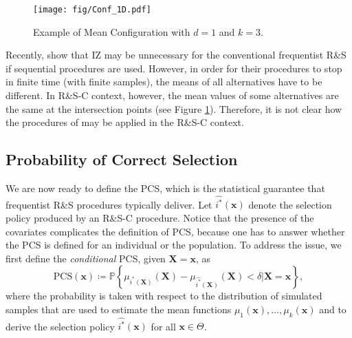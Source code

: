 \documentclass[ijoc,nonblindrev]{informs3}
\def\pr{\mathbb{P}}
\def\bx{{\bm x}}
\def\bX{{\bm X}}
\begin{document}
\begin{figure}
\begin{center}
\texttt{[image: fig/Conf\_1D.pdf]}
\caption{Example of Mean Configuration with $d=1$ and $k=3$.} \label{fig-Conf}
\end{center}
\end{figure}


\begin{remark}
Recently, \cite{fan2016} show that IZ may be unnecessary for the conventional frequentist R\&S if sequential procedures are used.
However, in order for their procedures to stop in finite time (with finite samples), the means of all alternatives have to be different.
In R\&S-C context, however, the mean values of some alternatives are the same at the intersection points (see Figure \ref{fig-Conf}).
Therefore, it is not clear how the procedures of \cite{fan2016} may be applied in the R\&S-C context.
\end{remark}



\subsection{Probability of Correct Selection}

We are now ready to define the PCS, which is the statistical guarantee that frequentist R\&S procedures typically deliver.
Let $\widehat{i^*}(\bx)$ denote the selection policy produced by an R\&S-C procedure.
Notice that the presence of the covariates complicates the definition of PCS, because one has to answer whether the PCS is defined for an individual or the population.
To address the issue, we first define the \textit{conditional} PCS, given $\bX=\bx$, as
\begin{equation} \label{eq-PCSX}
\text{PCS}(\bx) \coloneqq \pr \left\{ \mu_{i^*(\bX)}(\bX) - \mu_{\widehat{i^*}(\bX)}(\bX)  < \delta \big|\bX=\bx \right\},
\end{equation}
where the probability is taken with respect to the distribution of simulated samples that are used to estimate the mean functions $\mu_1(\bx),\ldots,\mu_k(\bx)$ and to derive the selection policy $\widehat{i^*}(\bx)$ for all $\bx\in\Theta$.
\end{document}
